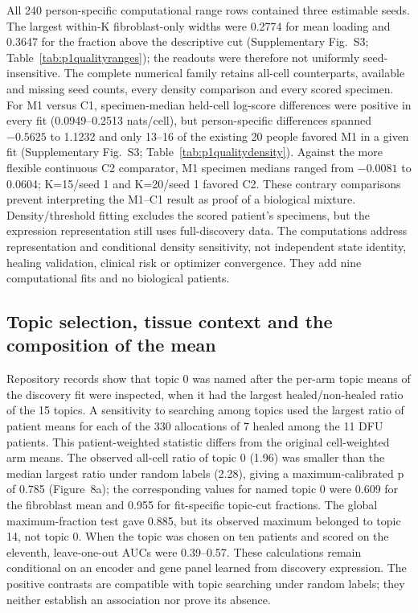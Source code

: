 \documentclass[10pt,a4paper]{article}
\begin{document}
All 240 person-specific computational range rows contained three estimable seeds. The largest within-K fibroblast-only widths were 0.2774 for mean loading and 0.3647 for the fraction above the descriptive cut (Supplementary Fig.~S3; Table~\ref{tab:p1qualityranges}); the readouts were therefore not uniformly seed-insensitive. The complete numerical family retains all-cell counterparts, available and missing seed counts, every density comparison and every scored specimen. For M1 versus C1, specimen-median held-cell log-score differences were positive in every fit (0.0949--0.2513 nats/cell), but person-specific differences spanned $-0.5625$ to 1.1232 and only 13--16 of the existing 20 people favored M1 in a given fit (Supplementary Fig.~S3; Table~\ref{tab:p1qualitydensity}). Against the more flexible continuous C2 comparator, M1 specimen medians ranged from $-0.0081$ to 0.0604; K=15/seed 1 and K=20/seed 1 favored C2. These contrary comparisons prevent interpreting the M1--C1 result as proof of a biological mixture. Density/threshold fitting excludes the scored patient's specimens, but the expression representation still uses full-discovery data. The computations address representation and conditional density sensitivity, not independent state identity, healing validation, clinical risk or optimizer convergence. They add nine computational fits and no biological patients.

\subsection{Topic selection, tissue context and the composition of the mean}

Repository records show that topic 0 was named after the per-arm topic means of the discovery fit were inspected, when it had the largest healed/non-healed ratio of the 15 topics. A sensitivity to searching among topics used the largest ratio of patient means for each of the 330 allocations of 7 healed among the 11 DFU patients. This patient-weighted statistic differs from the original cell-weighted arm means. The observed all-cell ratio of topic 0 (1.96) was smaller than the median largest ratio under random labels (2.28), giving a maximum-calibrated p of 0.785 (Figure~8a\label{call:p1f11}); the corresponding values for named topic 0 were 0.609 for the fibroblast mean and 0.955 for fit-specific topic-cut fractions. The global maximum-fraction test gave 0.885, but its observed maximum belonged to topic 14, not topic 0. When the topic was chosen on ten patients and scored on the eleventh, leave-one-out AUCs were 0.39--0.57. These calculations remain conditional on an encoder and gene panel learned from discovery expression. The positive contrasts are compatible with topic searching under random labels; they neither establish an association nor prove its absence.
\end{document}

